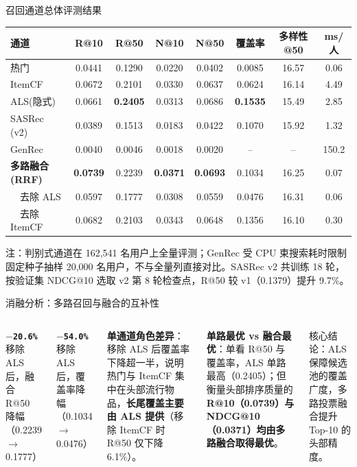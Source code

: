 \documentclass[aspectratio=169,11pt,fontset=none]{ctexbeamer}
\newcommand{\stat}[3][26]{{\fontsize{#1}{\numexpr#1+2\relax}\selectfont\bfseries\textcolor{accent}{\texttt{#2}}}\\[1pt]{\color{mute}\small #3}\par}
\begin{document}
\begin{frame}{召回通道总体评测结果}
  \centering\small
  \setlength{\tabcolsep}{5pt}
  \begin{tabular}{lccccccc}
    \toprule
    {\color{mute}通道} & R@10 & R@50 & N@10 & N@50 & 覆盖率 & 多样性@50 & {\color{mute}ms/人} \\
    \midrule
    热门 & 0.0441 & 0.1290 & 0.0220 & 0.0402 & 0.0085 & 16.57 & 0.06 \\
    ItemCF & 0.0672 & 0.2101 & 0.0330 & 0.0637 & 0.0624 & 16.14 & 4.49 \\
    ALS(隐式) & 0.0661 & \textbf{0.2405} & 0.0313 & 0.0686 & \textbf{0.1535} & 15.49 & 2.85 \\
    SASRec (v2) & 0.0389 & 0.1513 & 0.0183 & 0.0422 & 0.1070 & 15.92 & 1.32 \\
    GenRec & 0.0040 & 0.0046 & 0.0018 & 0.0020 & {\color{mute}--} & {\color{mute}--} & 150.2 \\
    \rowcolor{accent!10}
    \textbf{多路融合(RRF)} & \textbf{0.0739} & 0.2239 & \textbf{0.0371} & \textbf{0.0693} & 0.1034 & 16.25 & 0.07 \\
    {\color{mute}~~去除 ALS} & 0.0597 & 0.1777 & 0.0308 & 0.0559 & 0.0476 & 16.31 & 0.06 \\
    {\color{mute}~~去除 ItemCF} & 0.0682 & 0.2103 & 0.0343 & 0.0648 & 0.1356 & 16.10 & 0.30 \\
    \bottomrule
  \end{tabular}

  \vspace{7pt}\small\color{mute}
  注：判别式通道在 162{,}541 名用户上全量评测；GenRec 受 CPU 束搜索耗时限制固定种子抽样 20{,}000 名用户，不与全量列直接对比。SASRec v2 共训练 18 轮，按验证集 NDCG@10 选取 v2 第 8 轮检查点，R@50 较 v1（0.1379）提升 9.7\%。
\end{frame}

\begin{frame}{消融分析：多路召回与融合的互补性}
  \begin{columns}[T]
    \vspace{2pt}
    \stat{$-$20.6\%}{移除 ALS 后，融合 R@50 降幅（0.2239 $\to$ 0.1777）}\vspace{10pt}
    \stat{$-$54.0\%}{移除 ALS 后，覆盖率降幅（0.1034 $\to$ 0.0476）}
    \small
    \textbf{单通道角色差异}：移除 ALS 后覆盖率下降超一半，说明热门与 ItemCF 集中在头部流行物品，\textbf{长尾覆盖主要由 ALS 提供}（移除 ItemCF 时 R@50 仅下降 6.1\%）。

    \vspace{8pt}
    \textbf{单路最优 vs 融合最优}：单看 R@50 与覆盖率，ALS 单路最高（0.2405）；但衡量头部排序质量的 \textbf{R@10（0.0739）与 NDCG@10（0.0371）均由多路融合取得最优}。

    \vspace{8pt}
    \alert{核心结论：ALS 保障候选池的覆盖广度，多路投票融合提升 Top-10 的头部精度。}
  \end{columns}
\end{frame}
\end{document}

